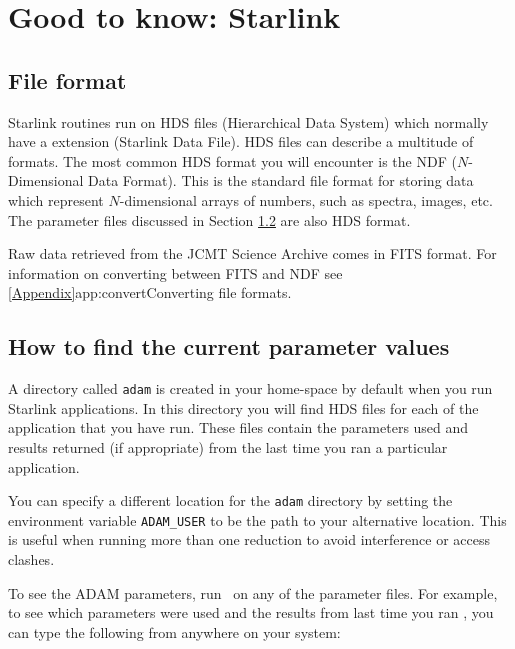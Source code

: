 \documentclass[11pt,oneside,chapters]{starlink}
\begin{document}
\newpage
\chapter{Good to know: Starlink}
\label{sec:starlink}

\section{File format}
\label{sec:format}

Starlink routines run on HDS files (Hierarchical Data System) which
normally have a  extension (Starlink Data File). HDS files can
describe a multitude of formats. The most common HDS format you will
encounter is the NDF ($N$-Dimensional Data Format)\cite{ssds}. This is the standard
file format for storing data which represent $N$-dimensional arrays of
numbers, such as spectra, images, etc. The parameter files discussed
in Section \ref{sec:hdstrace} are also HDS format.

Raw data retrieved from the JCMT Science Archive comes in FITS format.
For information on converting between FITS and NDF see
\cref{Appendix}{app:convert}{Converting file formats}.

\section{How to find the current parameter values}
\label{sec:hdstrace}

A directory called \texttt{adam} is created in your home-space by
default when you run Starlink applications. In this directory you will
find HDS files for each of the application that you have run. These
files contain the parameters used and results returned (if
appropriate) from the last time you ran a particular application.

You can specify a different location for the \texttt{adam} directory
by setting the environment variable \texttt{ADAM\_USER} to be the path
to your alternative location. This is useful when running more than
one reduction to avoid interference or access clashes.

To see the ADAM parameters, run \HDSTRACE\ on any of the parameter
files. For example, to see which parameters were used and the results
from last time you ran \stats, you can type the following from
anywhere on your system:

\begin{terminalv}
\end{terminalv}
\end{document}
